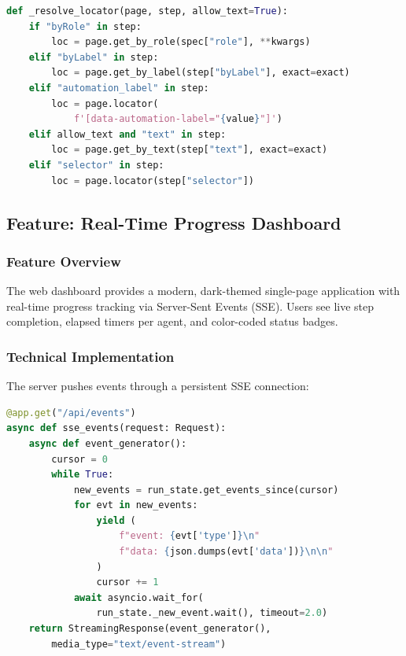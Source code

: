 \documentclass[12pt,a4paper]{article}
\begin{document}
\begin{lstlisting}[language=Python, caption={Element Targeting Resolution}, label={lst:targeting}]
def _resolve_locator(page, step, allow_text=True):
    if "byRole" in step:
        loc = page.get_by_role(spec["role"], **kwargs)
    elif "byLabel" in step:
        loc = page.get_by_label(step["byLabel"], exact=exact)
    elif "automation_label" in step:
        loc = page.locator(
            f'[data-automation-label="{value}"]')
    elif allow_text and "text" in step:
        loc = page.get_by_text(step["text"], exact=exact)
    elif "selector" in step:
        loc = page.locator(step["selector"])
\end{lstlisting}

\subsection{Feature: Real-Time Progress Dashboard}
\label{subsec:feature-dashboard}

\subsubsection{Feature Overview}
The web dashboard provides a modern, dark-themed single-page application with real-time progress tracking via Server-Sent Events (SSE). Users see live step completion, elapsed timers per agent, and color-coded status badges.

\subsubsection{Technical Implementation}
The server pushes events through a persistent SSE connection:

\begin{lstlisting}[language=Python, caption={SSE Event Streaming}, label={lst:sse}]
@app.get("/api/events")
async def sse_events(request: Request):
    async def event_generator():
        cursor = 0
        while True:
            new_events = run_state.get_events_since(cursor)
            for evt in new_events:
                yield (
                    f"event: {evt['type']}\n"
                    f"data: {json.dumps(evt['data'])}\n\n"
                )
                cursor += 1
            await asyncio.wait_for(
                run_state._new_event.wait(), timeout=2.0)
    return StreamingResponse(event_generator(),
        media_type="text/event-stream")
\end{lstlisting}
\end{document}
